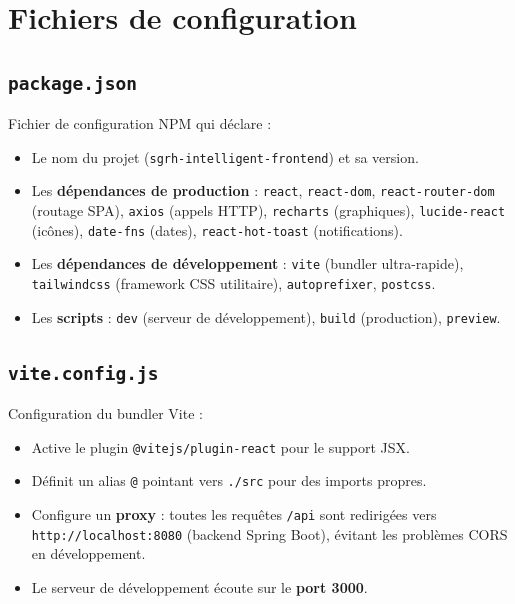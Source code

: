 \documentclass[a4paper,12pt]{report}
\begin{document}
\section{Fichiers de configuration}

\subsection{\texttt{package.json}}
Fichier de configuration NPM qui déclare :
\begin{itemize}
  \item Le nom du projet (\texttt{sgrh-intelligent-frontend}) et sa version.
  \item Les \textbf{dépendances de production} : \texttt{react}, \texttt{react-dom}, \texttt{react-router-dom} (routage SPA), \texttt{axios} (appels HTTP), \texttt{recharts} (graphiques), \texttt{lucide-react} (icônes), \texttt{date-fns} (dates), \texttt{react-hot-toast} (notifications).
  \item Les \textbf{dépendances de développement} : \texttt{vite} (bundler ultra-rapide), \texttt{tailwindcss} (framework CSS utilitaire), \texttt{autoprefixer}, \texttt{postcss}.
  \item Les \textbf{scripts} : \texttt{dev} (serveur de développement), \texttt{build} (production), \texttt{preview}.
\end{itemize}

\subsection{\texttt{vite.config.js}}
Configuration du bundler Vite :
\begin{itemize}
  \item Active le plugin \texttt{@vitejs/plugin-react} pour le support JSX.
  \item Définit un alias \texttt{@} pointant vers \texttt{./src} pour des imports propres.
  \item Configure un \textbf{proxy} : toutes les requêtes \texttt{/api} sont redirigées vers \texttt{http://localhost:8080} (backend Spring Boot), évitant les problèmes CORS en développement.
  \item Le serveur de développement écoute sur le \textbf{port 3000}.
\end{itemize}
\end{document}
